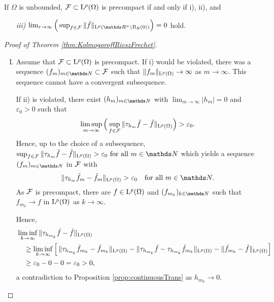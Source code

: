 \begin{rem}
  If $\Omega$ is unbounded, $\mathcal{F} \subset \mathrm{L}^p(\Omega)$ is precompact if and only if i), ii), and
  \begin{enumerate}
    \item[\textit{iii)}] $
  \lim_{r \to \infty} \Big( \sup_{f \in \FF} \|\tilde f\|_{\Ell^p(\R^n \setminus \BB_R(0))} \Big) = 0$ hold.
  \end{enumerate}
\end{rem}

\begin{proof}[Proof of Theorem \ref{thm:KolmogoroffRieszFrechet}]
  \begin{enumerate}[I)]
    \item Assume that $\mathcal{F} \subset \mathrm{L}^p(\Omega)$ is precompact.
      If i) would be violated, there was a sequence $(f_m)_{m \in\N} \subset \FF$ such that $\|f_m\|_{\mathrm{L}^p(\Omega)} \to \infty$ as $m \to \infty$. This sequence cannot have a convergent subsequence. 

      If ii) is violated, there exist $(h_m)_{m \in \N}$ with $\lim_{m \to \infty} |h_m| = 0$ and $\varepsilon_0  > 0$ such that 
      $$
      \limsup_{m \to \infty} \Big( \sup_{f \in \mathcal{F}} \| \tau_{h_m} \tilde f - \tilde f \|_{\mathrm{L}^p(\Omega)}\Big) > \varepsilon_0.
      $$
      Hence, up to the choice of a subsequence, 
      $
      \sup_{f \in \FF} \| \tau_{h_{m}} \tilde f - \tilde f \|_{\Ell^p(\Omega)} > \varepsilon_0 \text{ for all } m \in \N
      $
      which yields a sequence $(f_m)_{m \in \N}$ in $\mathcal{F}$ with
      $$
      \|\tau_{h_{m}} \tilde f_m - \tilde f_m \|_{\Ell^p(\Omega)} > \varepsilon_0 \quad\text{for all } m \in \N.
      $$
      As $\mathcal{F}$ is precompact, there are $f \in \mathrm{L}^p(\Omega)$ and $(f_{m_k})_{k \in \N}$ such that $f_{m_k} \to f$ in $\mathrm{L}^p(\Omega)$ as $k \to \infty$.

      Hence,
      \begin{align*}
        &\liminf_{k \to \infty} \| \tau_{h_{m_k}} \tilde f - \tilde f \|_{\mathrm{L}^p(\Omega)} \\
        &\quad 
        \geq \liminf_{k \to \infty} \Big[\, \|\tau_{h_{m_k}} \tilde f_{m_k} - \tilde f_{m_k}\|_{\mathrm{L}^p(\Omega)} - \|\tau_{h_{m_k}} \tilde f - \tau_{h_{m_k}} \tilde f_{m_k} \|_{\mathrm{L}^p(\Omega)} - \|\tilde f_{m_k} - \tilde f \|_{\mathrm{L}^p(\Omega)} \Big] \\
        &\quad
        \geq \varepsilon_0 - 0 - 0 = \varepsilon_0 > 0,
      \end{align*}
      a contradiction to Proposition \ref{prop:continuousTrans} as $h_{m_k} \to 0$.


\end{enumerate}
\end{proof}
